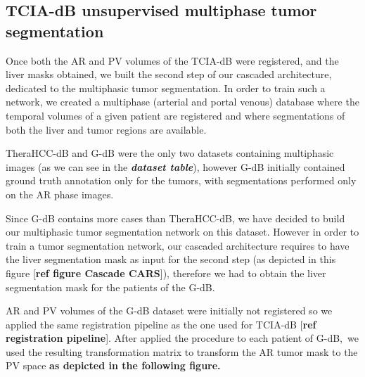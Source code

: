 \documentclass[]{article}
\begin{document}
\subsection{TCIA-dB unsupervised multiphase tumor
segmentation}\label{tcia-db-unsupervised-multiphase-tumor-segmentation}

Once both the AR and PV volumes of the TCIA-dB were registered, and the
liver masks obtained, we built the second step of our cascaded
architecture, dedicated to the multiphasic tumor segmentation. In order
to train such a network, we created a multiphase (arterial and portal
venous) database where the temporal volumes of a given patient are
registered and where segmentations of both the liver and tumor regions
are available.

TheraHCC-dB and G-dB were the only two datasets containing multiphasic
images (as we can see in the \emph{\textbf{dataset table}}), however
G-dB initially contained ground truth annotation only for the tumors,
with segmentations performed only on the AR phase images.

Since G-dB contains more cases than TheraHCC-dB, we have decided to
build our multiphasic tumor segmentation network on this dataset.
However in order to train a tumor segmentation network, our cascaded
architecture requires to have the liver segmentation mask as input for
the second step (as depicted in this figure {[}\textbf{ref figure
Cascade CARS}{]}), therefore we had to obtain the liver segmentation
mask for the patients of the G-dB.

AR and PV volumes of the G-dB dataset were initially not registered so
we applied the same registration pipeline as the one used for TCIA-dB
{[}\textbf{ref registration pipeline}{]}. After applied the procedure to
each patient of G-dB,~we used the resulting transformation matrix to
transform the AR tumor mask to the PV space \textbf{as depicted in the
following figure.}
\end{document}
